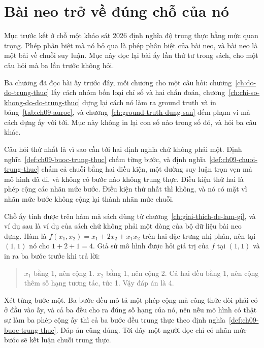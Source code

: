 \section{Bài neo trở về đúng chỗ của nó}
\label{sec:ch17-bai-neo-tro-ve}

%
Mục trước kết ở chỗ một khảo sát 2026 định nghĩa độ trung thực bằng mức quan
trọng. Phép phân biệt mà nó bỏ qua là phép phân biệt của bài neo, và bài neo là
một bài về chuỗi suy luận. Mục này đọc lại bài ấy lần thứ tư trong sách, cho một
câu hỏi mà ba lần trước không hỏi.

%
Ba chương đã đọc bài ấy trước đây, mỗi chương cho một câu hỏi:
chương~\ref{ch:do-do-trung-thuc} lấy cách nhóm bốn loại chỉ số và hai chẩn đoán,
chương~\ref{ch:chi-so-khong-do-do-trung-thuc} dựng lại cách nó làm ra ground
truth và in bảng~\ref{tab:ch09-auroc}, và
chương~\ref{ch:ground-truth-dung-san} đếm phạm vi mà cách dựng ấy với tới. Mục
này không in lại con số nào trong số đó, và hỏi ba câu khác.

%
Câu hỏi thứ nhất là vì sao cần tới hai định nghĩa chứ không phải một.
Định nghĩa~\ref{def:ch09-buoc-trung-thuc} chấm từng bước, và
định nghĩa~\ref{def:ch09-chuoi-trung-thuc} chấm cả chuỗi bằng hai điều kiện, một
đường suy luận trọn vẹn mà mô hình đã đi, và không có bước nào không trung thực.
Điều kiện thứ hai là phép cộng các nhãn mức bước. Điều kiện thứ nhất thì không,
và nó có mặt vì nhãn mức bước không cộng lại thành nhãn mức chuỗi.

%
Chỗ ấy tính được trên hàm mà sách dùng từ chương~\ref{ch:giai-thich-de-lam-gi},
và ví dụ sau là ví dụ của sách chứ không phải một dòng của bộ dữ liệu bài neo
dựng. Hàm là $f(x_1,x_2) = x_1 + 2x_2 + x_1x_2$ trên hai đặc trưng nhị phân, nên
tại $(1,1)$ nó cho $1 + 2 + 1 = 4$. Giả sử mô hình được hỏi giá trị của $f$ tại
$(1,1)$ và in ra ba bước trước khi trả lời:

\begin{quote}
$x_1$ bằng 1, nên cộng 1. $x_2$ bằng 1, nên cộng 2. Cả hai đều bằng 1, nên cộng
thêm số hạng tương tác, tức 1. Vậy đáp án là 4.
\end{quote}

Xét từng bước một. Ba bước đều mô tả một phép cộng mà công thức đòi phải có ở
đầu vào ấy, và cả ba đều cho ra đúng số hạng của nó, nên nếu mô hình có thật sự
làm ba phép cộng ấy thì cả ba bước đều trung thực theo
định nghĩa~\ref{def:ch09-buoc-trung-thuc}. Đáp án cũng đúng. Tới đây một người
đọc chỉ có nhãn mức bước sẽ kết luận chuỗi trung thực.

